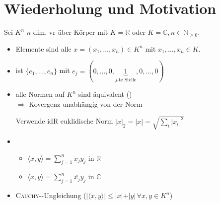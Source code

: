 \section{Wiederholung und Motivation}
Sei $K^n$ $n$-dim. \gls{vr} über Körper mit $K=\mathbb{R}$ oder $K=\mathbb{C}, n\in\mathbb{N}_{\ge 0}$.
\begin{itemize}
	\item Elemente sind alle $x=(x_1, \dotsc, x_n)\in K^n$ mit $x_1, \dotsc, x_n\in K$.
	\item {} ist $\{e_1, \dotsc, e_n\}$ mit $e_j=(0,\dotsc,0,\underbrace{1}_{\text{$j$-te Stelle}},0,\dotsc,0)$
	\item alle Normen auf $K^n$ sind äquivalent () \\
	$\Rightarrow$ Kovergenz unabhängig von der Norm
	
	Verwende idR euklidische Norm $\vert x \vert_2 = \vert x \vert = \sqrt{\sum_{i}\vert x_i \vert^2}$
	\item {}
	\begin{itemize}
		\item $\langle x,y \rangle = \sum_{j=1}^{n} x_j y_j$ in $\mathbb{R}$
		\item $\langle x,y \rangle = \sum_{j=1}^{n} \overline{x_j} y_j$ in $\mathbb{C}$
	\end{itemize}
	\item \textsc{Cauchy}--Ungleichung ($\vert \langle x,y\rangle \vert \le \vert x \vert + \vert y \vert\,\forall x,y\in K^n$)
\end{itemize}

